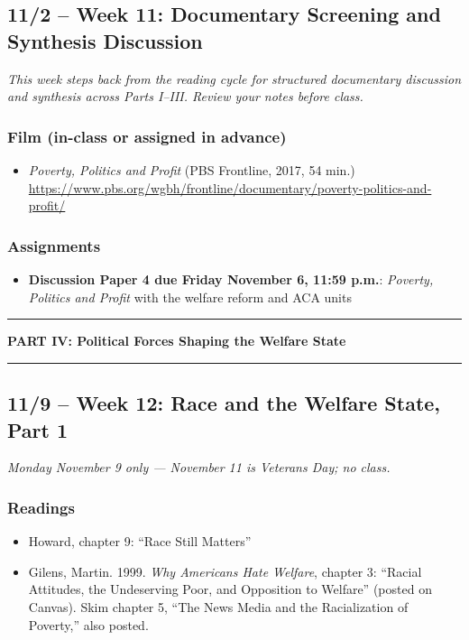 \documentclass[12pt]{article}
\begin{document}
\subsection*{11/2 -- Week 11: Documentary Screening and Synthesis Discussion}
\emph{This week steps back from the reading cycle for structured documentary discussion and synthesis across Parts I--III. Review your notes before class.}
    \subsubsection*{Film (in-class or assigned in advance)}
        \begin{itemize}
            \item \emph{Poverty, Politics and Profit} (PBS Frontline, 2017, 54 min.) \\
            \url{https://www.pbs.org/wgbh/frontline/documentary/poverty-politics-and-profit/}
        \end{itemize}
    \subsubsection*{Assignments}
        \begin{itemize}
            \item \textbf{Discussion Paper 4 due Friday November 6, 11:59 p.m.}: \emph{Poverty, Politics and Profit} with the welfare reform and ACA units
        \end{itemize}

\bigskip
\noindent\rule{\textwidth}{0.6pt}
\begin{center}\textbf{PART IV: Political Forces Shaping the Welfare State}\end{center}
\noindent\rule{\textwidth}{0.6pt}

\subsection*{11/9 -- Week 12: Race and the Welfare State, Part 1}
\emph{Monday November 9 only --- November 11 is Veterans Day; no class.}
    \subsubsection*{Readings}
        \begin{itemize}
            \item Howard, chapter 9: ``Race Still Matters''
            \item Gilens, Martin. 1999. \emph{Why Americans Hate Welfare}, chapter 3: ``Racial Attitudes, the Undeserving Poor, and Opposition to Welfare'' (posted on Canvas). Skim chapter 5, ``The News Media and the Racialization of Poverty,'' also posted.
        \end{itemize}
\end{document}
